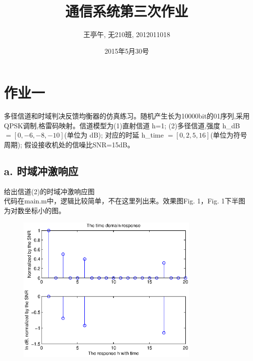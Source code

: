 \documentclass{article}
\begin{document}
\title{通信系统第三次作业}
\author{王亭午, 无210班, 2012011018}
\date{2015年5月30号}
\maketitle
\section{作业一}
多径信道和时域判决反馈均衡器的仿真练习。随机产生长为10000bit的01序列,采用
QPSK调制,格雷码映射。信道模型为(1)直射信道 h=1; (2)多径信道,强度 h\_dB \(=[0,-6,-8,-10]\)(单位为 dB);
对应的时延 h\_time \(=[0,2,5,16]\)(单位为符号周期);
假设接收机处的信噪比SNR=15dB。
\subsection*{a. 时域冲激响应}给出信道(2)的时域冲激响应图\\
代码在main.m中，逻辑比较简单，不在这里列出来。效果图Fig. 1，Fig. 1下半图为对数坐标小的图。
\begin{figure}[b!]
\centering
\includegraphics[width=9cm]{1.eps}
\caption{}
\end{figure}
\end{document}
